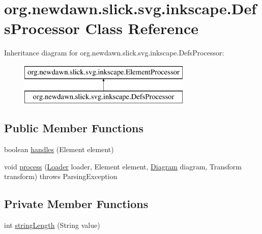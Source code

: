 \hypertarget{classorg_1_1newdawn_1_1slick_1_1svg_1_1inkscape_1_1_defs_processor}{}\section{org.\+newdawn.\+slick.\+svg.\+inkscape.\+Defs\+Processor Class Reference}
\label{classorg_1_1newdawn_1_1slick_1_1svg_1_1inkscape_1_1_defs_processor}
Inheritance diagram for org.\+newdawn.\+slick.\+svg.\+inkscape.\+Defs\+Processor\+:\begin{figure}[H]
\begin{center}
\leavevmode
\includegraphics[height=2.000000cm]{classorg_1_1newdawn_1_1slick_1_1svg_1_1inkscape_1_1_defs_processor}
\end{center}
\end{figure}
\subsection*{Public Member Functions}
\begin{DoxyCompactItemize}
\item 
boolean \mbox{\hyperlink{classorg_1_1newdawn_1_1slick_1_1svg_1_1inkscape_1_1_defs_processor_a648d4dd3a482f1a7f329a7b1ae27e387}{handles}} (Element element)
\item 
void \mbox{\hyperlink{classorg_1_1newdawn_1_1slick_1_1svg_1_1inkscape_1_1_defs_processor_a1ed9ee8ac601c75d66568a7c5dc84e17}{process}} (\mbox{\hyperlink{interfaceorg_1_1newdawn_1_1slick_1_1svg_1_1_loader}{Loader}} loader, Element element, \mbox{\hyperlink{classorg_1_1newdawn_1_1slick_1_1svg_1_1_diagram}{Diagram}} diagram, Transform transform)  throws Parsing\+Exception 
\end{DoxyCompactItemize}
\subsection*{Private Member Functions}
\begin{DoxyCompactItemize}
\item 
int \mbox{\hyperlink{classorg_1_1newdawn_1_1slick_1_1svg_1_1inkscape_1_1_defs_processor_ab7a770c192ded7ccb0655791369c2475}{string\+Length}} (String value)
\end{DoxyCompactItemize}


